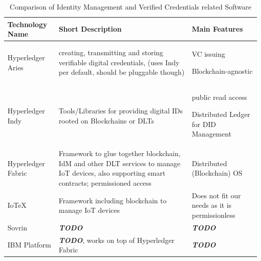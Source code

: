 \begin{table}
	\caption{Comparison of Identity Management and Verified Credentials related Software}
	\label{tab:Comparison of Identity Management and Verified Credentials related Software}
	\begin{center}
		\begin{tabular}[c]{|p{3cm}|p{6.5cm}|p{5.5cm}|}
			\hline
			\textbf{Technology Name}                                                &
			Short Description                                                       &
			Main Features                                                             \\
			\hline
			Hyperledger Aries \cite{hyperledger:wiki}                               &
			creating, transmitting and storing verifiable digital credentials, (uses Indy per default,
			should be pluggable though)                                             &
			\begin{tableitemize}
				\item VC issuing
				\item Blockchain-agnostic
			\end{tableitemize}                                                  \\
			\hline
			Hyperledger Indy \cite{hyperledger:wiki}                                &
			Tools/Libraries for providing digital IDs rooted on Blockchains or DLTs &
			\begin{tableitemize}
				\item public read access
				\item Distributed Ledger for DID Management
			\end{tableitemize}                                \\
			\hline
			Hyperledger Fabric \cite{hyperledger:fabric:docs}                       &
			Framework to glue together blockchain, IdM and other DLT services to manage IoT devices, also
			supporting smart contracts; permissioned access                         &
			\begin{tableitemize}
				\item Distributed (Blockchain) OS
			\end{tableitemize}                                          \\
			\hline
			IoTeX \cite{iotex-bc-platform}                                          &
			Framework including blockchain to manage IoT devices                    &
			Does not fit our needs as it is permissionless                            \\
			\hline
			Sovrin                                                                  &
			\textbf{\textit{TODO}}                                                  &
			\textbf{\textit{TODO}}                                                    \\
			\hline
			IBM Platform                                                            &
			\textbf{\textit{TODO}}, works on top of Hyperledger Fabric              &
			\textbf{\textit{TODO}}                                                    \\
			\hline
		\end{tabular}
	\end{center}
\end{table}
